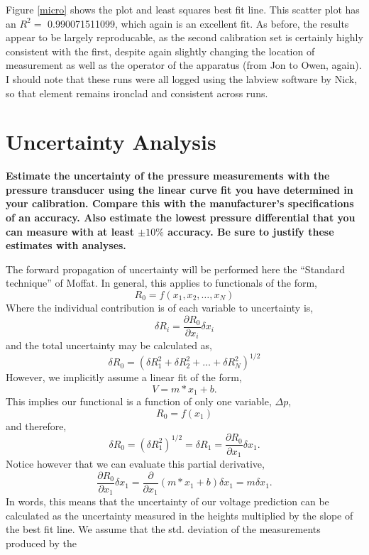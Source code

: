 \documentclass{article}
\begin{document}
Figure \ref{micro} shows the plot and least squares best fit line. 
This scatter plot has an $R^2 =$ 0.990071511099, which again is an
excellent fit. As before, the results appear to be largely reproducable,
as the second calibration set is certainly highly consistent with the
first, despite again slightly changing the location of measurement as
well as the operator of the apparatus (from Jon to Owen, again). I
should note that these runs were all logged using the labview software
by Nick, so that element remains ironclad and consistent across runs. 

\newpage
\section{Uncertainty Analysis}

\textbf{Estimate the uncertainty of the pressure measurements with the
pressure transducer using the linear curve fit you have determined in
your calibration. Compare this with the manufacturer's specifications of
an accuracy. Also estimate the lowest pressure differential that you can
measure with at least $\pm 10\%$ accuracy. Be sure to justify these
estimates with analyses.}

The forward propagation of uncertainty will be performed here the
``Standard technique'' of Moffat. In general, this applies to
functionals of the form, 
\begin{equation}
  R_0 = f(x_1,x_2, \ldots ,x_N)
\end{equation}
Where the individual contribution is of each variable to uncertainty is,
\begin{equation}
  \delta R_i = \frac{\partial R_0}{\partial x_i} \delta x_i
\end{equation}
and the total uncertainty may be calculated as, 
\begin{equation}
  \delta R_0 = \left(\delta R_1^2 + \delta R_2^2 + \ldots + \delta R_N^2 \right)^{1/2}
\end{equation}
However, we implicitly assume a linear fit of the form, 
\begin{equation}
  V = m*x_1 + b. 
\end{equation}
This implies our functional is a function of only one variable, $\Delta p$, 
\begin{equation}
  R_0 = f(x_1)
\end{equation}
and therefore,
\begin{equation}
  \delta R_0 = \left(\delta R_1^2 \right)^{1/2} = \delta R_1 =
   \frac{\partial R_0}{\partial x_1} \delta x_1.
\end{equation}
 Notice however that we can evaluate this partial derivative, 
\begin{equation}
 \frac{\partial R_0}{\partial x_1} \delta x_1 = \frac{\partial}{\partial
  x_1}\left( m*x_1 +b \right) \delta x_1 = m \delta x_1. 
\end{equation}
In words, this means that the uncertainty of our voltage prediction can
be calculated as the uncertainty measured in the heights multiplied by
the slope of the best fit line. We assume that the std. deviation of the
measurements produced by the 
\end{document}
